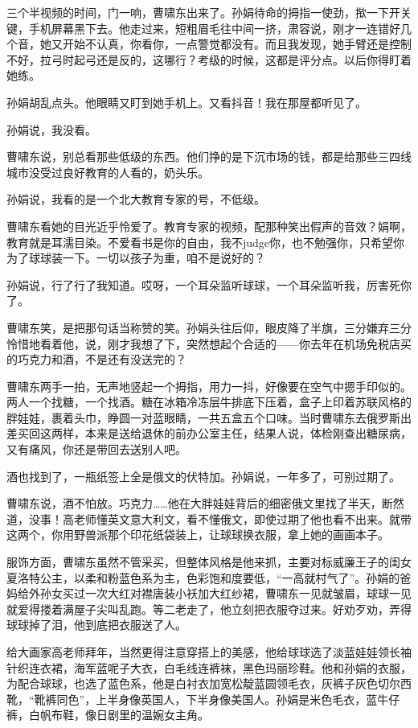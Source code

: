 \documentclass[lang=cn,newtx,12pt,scheme=chinese]{elegantbook}
\begin{document}
三个半视频的时间，门一响，曹啸东出来了。孙娟待命的拇指一使劲，揿一下开关键，手机屏幕黑下去。他走过来，短粗眉毛往中间一挤，肃容说，刚才一连错好几个音，她又开始不认真，你看你，一点警觉都没有。而且我发现，她手臂还是控制不好，拉弓时起弓还是反的，这哪行？考级的时候，这都是评分点。以后你得盯着她练。

孙娟胡乱点头。他眼睛又盯到她手机上。又看抖音！我在那屋都听见了。

孙娟说，我没看。

曹啸东说，别总看那些低级的东西。他们挣的是下沉市场的钱，都是给那些三四线城市没受过良好教育的人看的，奶头乐。

孙娟说，我看的是一个北大教育专家的号，不低级。

曹啸东看她的目光近乎怜爱了。教育专家的视频，配那种笑出假声的音效？娟啊，教育就是耳濡目染。不爱看书是你的自由，我不judge你，也不勉强你，只希望你为了球球装一下。一切以孩子为重，咱不是说好的？

孙娟说，行了行了我知道。哎呀，一个耳朵监听球球，一个耳朵监听我，厉害死你了。

曹啸东笑，是把那句话当称赞的笑。孙娟头往后仰，眼皮降了半旗，三分嫌弃三分怜惜地看着他，说，刚才我想了下，突然想起个合适的——你去年在机场免税店买的巧克力和酒，不是还有没送完的？

曹啸东两手一拍，无声地竖起一个拇指，用力一抖，好像要在空气中摁手印似的。两人一个找糖，一个找酒。糖在冰箱冷冻层牛排底下压着，盒子上印着苏联风格的胖娃娃，裹着头巾，睁圆一对蓝眼睛，一共五盒五个口味。当时曹啸东去俄罗斯出差买回这两样，本来是送给退休的前办公室主任，结果人说，体检刚查出糖尿病，又有痛风，你还是带回去送别人吧。

酒也找到了，一瓶纸签上全是俄文的伏特加。孙娟说，一年多了，可别过期了。

曹啸东说，酒不怕放。巧克力……他在大胖娃娃背后的细密俄文里找了半天，断然道，没事！高老师懂英文意大利文，看不懂俄文，即使过期了他也看不出来。就带这两个，你用野兽派那个印花纸袋装上，让球球换衣服，拿上她的画画本子。

服饰方面，曹啸东虽然不管采买，但整体风格是他来抓，主要对标威廉王子的闺女夏洛特公主，以柔和粉蓝色系为主，色彩饱和度要低，“一高就村气了”。孙娟的爸妈给外孙女买过一次大红对襟唐装小袄加大红纱裙，曹啸东一见就皱眉，球球一见就爱得搂着满屋子尖叫乱跑。等二老走了，他立刻把衣服夺过来。好劝歹劝，弄得球球掉了泪，他到底把衣服送了人。

给大画家高老师拜年，当然更得注意穿搭上的美感，他给球球选了淡蓝娃娃领长袖针织连衣裙，海军蓝呢子大衣，白毛线连裤袜，黑色玛丽珍鞋。他和孙娟的衣服，为配合球球，也选了蓝色系，他是白衬衣加宽松靛蓝圆领毛衣，灰裤子灰色切尔西靴，“靴裤同色”，上半身像英国人，下半身像美国人。孙娟是米色毛衣，蓝牛仔裤，白帆布鞋，像日剧里的温婉女主角。
\end{document}
